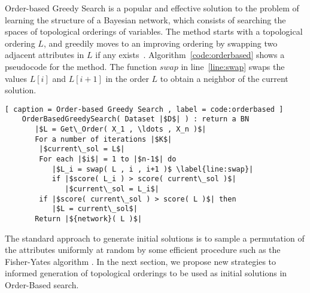 Order-based Greedy Search is a popular and effective solution to the problem of learning the structure of a Bayesian network, which consists of searching the spaces of topological orderings of variables. The method starts with a topological ordering $L$, and greedily moves to an improving ordering by swapping two adjacent attributes in $L$ if any exists~\cite{TK05}. Algorithm~\ref{code:orderbased} shows a pseudocode for the method. The function ${swap}$ in line~\ref{line:swap} swaps the values $L[ i ]$ and $L[ i + 1 ]$ in the order $L$ to obtain a neighbor of the current solution.

\begin{lstlisting}[ caption = Order-based Greedy Search , label = code:orderbased ]
	OrderBasedGreedySearch( Dataset |$D$| ) : return a BN
	   |$L = Get\_Order( X_1 , \ldots , X_n )$|
	   For a number of iterations |$K$|
		|$current\_sol = L$|
		For each |$i$| = 1 to |$n-1$| do
		   |$L_i = swap( L , i , i+1 )$ \label{line:swap}|
		   if |$score( L_i ) > score( current\_sol )$|
		      |$current\_sol = L_i$|
		if |$score( current\_sol ) > score( L )$| then
		   |$L = current\_sol$|
	   Return |${network}( L )$|
\end{lstlisting}

The standard approach to generate initial solutions is to sample a permutation of the attributes uniformly at random by some efficient procedure such as the Fisher-Yates algorithm \cite{FisherYates98,TK05}. In the next section, we propose new strategies to informed generation of topological orderings to be used as initial solutions in Order-Based search.

